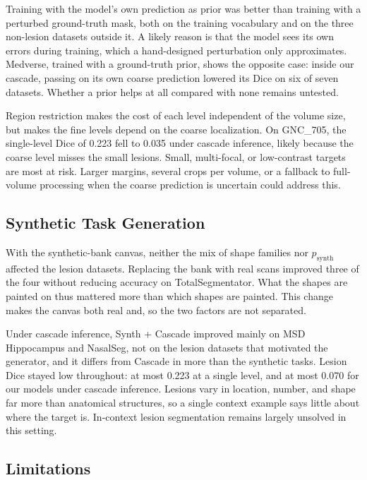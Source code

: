 Training with the model's own prediction as prior was better than training
with a perturbed ground-truth mask, both on the training vocabulary and on the
three non-lesion datasets outside it. A likely reason is that the model sees
its own errors during training, which a hand-designed perturbation only
approximates. Medverse, trained with a ground-truth prior, shows the opposite
case: inside our cascade, passing on its own coarse prediction lowered its
Dice on six of seven datasets. Whether a prior helps at all compared with none
remains untested.

Region restriction makes the cost of each level independent of the volume
size, but makes the fine levels depend on the coarse localization. On
GNC\_705, the single-level Dice of 0.223 fell to 0.035 under cascade
inference, likely because the coarse level misses the small lesions. Small,
multi-focal, or low-contrast targets are most at risk. Larger margins, several
crops per volume, or a fallback to full-volume processing when the coarse
prediction is uncertain could address this.

\subsection{Synthetic Task Generation}\label{sec:discussion-synth}

With the synthetic-bank canvas, neither the mix of shape families nor
$p_\text{synth}$ affected the lesion datasets. Replacing the bank with real scans improved three of the four without reducing accuracy on
TotalSegmentator. What the shapes are painted on thus mattered more than which
shapes are painted. This change makes the canvas both real and, so the
two factors are not separated.

Under cascade inference, Synth + Cascade improved mainly on MSD Hippocampus
and NasalSeg, not on the lesion datasets that motivated the generator, and it
differs from Cascade in more than the synthetic tasks. Lesion Dice stayed low
throughout: at most 0.223 at a single level, and at most 0.070 for our models
under cascade inference. Lesions vary in location, number, and shape far more
than anatomical structures, so a single context example says little about
where the target is. In-context lesion segmentation remains largely unsolved
in this setting.

\subsection{Limitations}\label{sec:discussion-limitations}

